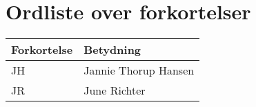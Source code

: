 \section{Ordliste over forkortelser}

\vspace{1cm}
\begin{table}[hbt]
\centering
\label{ordliste}
\begin{tabular}{|l|l|}
\hline
\textbf{Forkortelse             } & \textbf{Betydning             } \\ \hline
JH & Jannie Thorup Hansen \\ \hline
JR & June Richter  \\ \hline
\end{tabular}
\end{table}